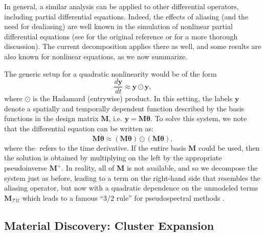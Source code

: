 \documentclass[twocolumn,aps,prx,superscriptaddress,10pt]{revtex4-2}
\newcommand{\by}{\bm{y}}
\newcommand{\y}{\by}  %
\newcommand{\0}{\bm{0}}
\newcommand{\btheta}{\boldsymbol{\theta}}
\newcommand{\T}{\mathcal{T}} %
\newcommand{\U}{\mathcal{U}} %
\newcommand{\bbM}{\mathbf{M}}
\newcommand{\MTU}{\bbM_{\T\U}}
\begin{document}
In general, a similar analysis can be applied to other differential operators, including partial differential equations.
Indeed, the effects of aliasing (and the need for dealiasing) are well known in the simulation of nonlinear partial differential equations (see \cite{orszag1971elimination} for the original reference or \cite{boyd2001chebyshev} for a more thorough discussion).
The current decomposition applies there as well, and some results are also known for nonlinear equations, as we now summarize.

The generic setup for a quadratic nonlinearity would be of the form
\begin{equation*}
    \frac{d\y}{dt} \approx \y\odot \y,
\end{equation*}
where $\odot$ is the Hadamard (entrywise) product.
In this setting, the labels $\y$ denote a spatially and temporally dependent function described by the basis functions in the design matrix $\bbM$, i.e. $\y = \bbM\btheta$.  To solve this system, we note that the differential equation can be written as:
\begin{equation*}
    \bbM \dot{\btheta} \approx(\bbM\btheta) \odot (\bbM\btheta),
\end{equation*}
where the $\dot{}$ refers to the time derivative.  If the entire basis $\bbM$ could be used, then the solution is obtained by multiplying on the left by the appropriate pseudoinverse $\bbM^+$.  In reality, all of $\bbM$ is not available, and so we decompose the system just as before, leading to a term on the right-hand side that resembles the aliasing operator, but now with a quadratic dependence on the unmodeled terms $\MTU$ which leads to a famous ``$3/2$ rule'' for pseudospectral methods \cite{orszag1971elimination}.

\subsection{Material Discovery: Cluster Expansion}
\label{sec:realworld}
\end{document}
